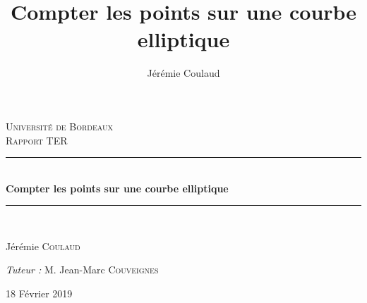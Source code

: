 \documentclass[12pt]{article}
\title{Compter les points sur une courbe elliptique}
\author{Jérémie Coulaud}
\newcommand{\HRule}{\rule{\linewidth}{0.5mm}}
\begin{document}
\newtheorem{prop}{Proposition}
\newtheorem{defi}{Définition}
\newtheorem{thm}{Théorème}
\begin{titlepage}
\begin{sffamily}
\begin{center}
\textsc{\LARGE Université de Bordeaux} \\[2.0cm]
\textsc{\large Rapport TER} \\[1.5cm]
\vspace{3cm}
    \HRule \\[0.4cm]
    { \huge \bfseries Compter les points sur une courbe elliptique\\[0.4cm] }
 \HRule \\[2cm]
 
 \vspace{7cm}
    \begin{minipage}{0.4\textwidth}
      \begin{flushleft} \large
        Jérémie \textsc{Coulaud}\\
      \end{flushleft}
    \end{minipage}
    \begin{minipage}{0.4\textwidth}
      \begin{flushright} \large
        \emph{Tuteur :} M. Jean-Marc \textsc{Couveignes}
      \end{flushright}
    \end{minipage}

 \vfill
    {\large 18 Février 2019}

\end{center}
\end{sffamily}
\end{titlepage}
\newpage
\tableofcontents
\newpage
\end{document}
